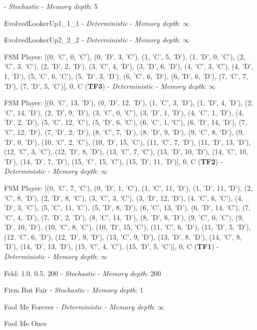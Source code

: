  - \textit{Stochastic} - \textit{Memory depth}: 5\item EvolvedLookerUp1\_1\_1
 - \textit{Deterministic} - \textit{Memory depth}: \(\infty\)\item EvolvedLookerUp2\_2\_2
 - \textit{Deterministic} - \textit{Memory depth}: \(\infty\)\item FSM Player: [(0, 'C', 0, 'C'), (0, 'D', 3, 'C'), (1, 'C', 5, 'D'), (1, 'D', 0, 'C'), (2, 'C', 3, 'C'), (2, 'D', 2, 'D'), (3, 'C', 4, 'D'), (3, 'D', 6, 'D'), (4, 'C', 3, 'C'), (4, 'D', 1, 'D'), (5, 'C', 6, 'C'), (5, 'D', 3, 'D'), (6, 'C', 6, 'D'), (6, 'D', 6, 'D'), (7, 'C', 7, 'D'), (7, 'D', 5, 'C')], 0, C
(\textbf{TF3}) - \textit{Deterministic} - \textit{Memory depth}: \(\infty\)\item FSM Player: [(0, 'C', 13, 'D'), (0, 'D', 12, 'D'), (1, 'C', 3, 'D'), (1, 'D', 4, 'D'), (2, 'C', 14, 'D'), (2, 'D', 9, 'D'), (3, 'C', 0, 'C'), (3, 'D', 1, 'D'), (4, 'C', 1, 'D'), (4, 'D', 2, 'D'), (5, 'C', 12, 'C'), (5, 'D', 6, 'C'), (6, 'C', 1, 'C'), (6, 'D', 14, 'D'), (7, 'C', 12, 'D'), (7, 'D', 2, 'D'), (8, 'C', 7, 'D'), (8, 'D', 9, 'D'), (9, 'C', 8, 'D'), (9, 'D', 0, 'D'), (10, 'C', 2, 'C'), (10, 'D', 15, 'C'), (11, 'C', 7, 'D'), (11, 'D', 13, 'D'), (12, 'C', 3, 'C'), (12, 'D', 8, 'D'), (13, 'C', 7, 'C'), (13, 'D', 10, 'D'), (14, 'C', 10, 'D'), (14, 'D', 7, 'D'), (15, 'C', 15, 'C'), (15, 'D', 11, 'D')], 0, C
(\textbf{TF2}) - \textit{Deterministic} - \textit{Memory depth}: \(\infty\)\item FSM Player: [(0, 'C', 7, 'C'), (0, 'D', 1, 'C'), (1, 'C', 11, 'D'), (1, 'D', 11, 'D'), (2, 'C', 8, 'D'), (2, 'D', 8, 'C'), (3, 'C', 3, 'C'), (3, 'D', 12, 'D'), (4, 'C', 6, 'C'), (4, 'D', 3, 'C'), (5, 'C', 11, 'C'), (5, 'D', 8, 'D'), (6, 'C', 13, 'D'), (6, 'D', 14, 'C'), (7, 'C', 4, 'D'), (7, 'D', 2, 'D'), (8, 'C', 14, 'D'), (8, 'D', 8, 'D'), (9, 'C', 0, 'C'), (9, 'D', 10, 'D'), (10, 'C', 8, 'C'), (10, 'D', 15, 'C'), (11, 'C', 6, 'D'), (11, 'D', 5, 'D'), (12, 'C', 6, 'D'), (12, 'D', 9, 'D'), (13, 'C', 9, 'D'), (13, 'D', 8, 'D'), (14, 'C', 8, 'D'), (14, 'D', 13, 'D'), (15, 'C', 4, 'C'), (15, 'D', 5, 'C')], 0, C
(\textbf{TF1}) - \textit{Deterministic} - \textit{Memory depth}: \(\infty\)\item Feld: 1.0, 0.5, 200
 - \textit{Stochastic} - \textit{Memory depth}: 200\item Firm But Fair
 - \textit{Stochastic} - \textit{Memory depth}: 1\item Fool Me Forever
 - \textit{Deterministic} - \textit{Memory depth}: \(\infty\)\item Fool Me Once
